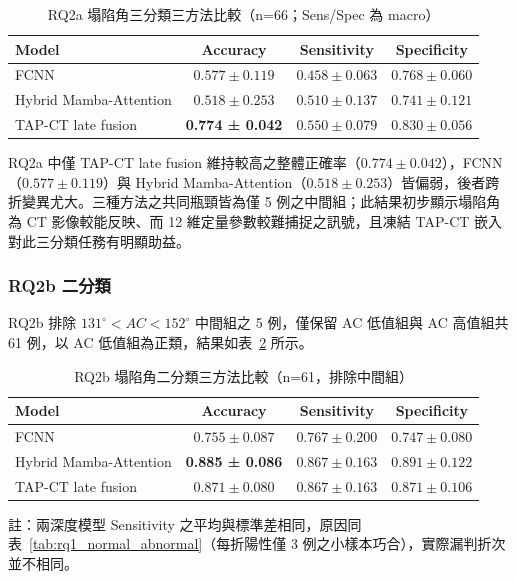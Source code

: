 \begin{ZhChapter}
\begin{table}[htbp]
\centering
\caption{RQ2a 塌陷角三分類三方法比較（n=66；Sens/Spec 為 macro）}
\label{tab:rq2a_3class}
\begingroup
\renewcommand{\arraystretch}{1.25}
\begin{tabularx}{0.95\textwidth}{>{\raggedright\arraybackslash}X c c c}
\hline
Model & Accuracy & Sensitivity & Specificity \\
\hline
FCNN & \(0.577 \pm 0.119\) & \(0.458 \pm 0.063\) & \(0.768 \pm 0.060\) \\
Hybrid Mamba-Attention & \(0.518 \pm 0.253\) & \(0.510 \pm 0.137\) & \(0.741 \pm 0.121\) \\
TAP-CT late fusion & \textbf{0.774 ± 0.042} & \(0.550 \pm 0.079\) & \(0.830 \pm 0.056\) \\
\hline
\end{tabularx}
\endgroup
\end{table}

RQ2a 中僅 TAP-CT late fusion 維持較高之整體正確率（\(0.774 \pm 0.042\)），FCNN（\(0.577 \pm 0.119\)）與 Hybrid Mamba-Attention（\(0.518 \pm 0.253\)）皆偏弱，後者跨折變異尤大。三種方法之共同瓶頸皆為僅 5 例之中間組；此結果初步顯示塌陷角為 CT 影像較能反映、而 12 維定量參數較難捕捉之訊號，且凍結 TAP-CT 嵌入對此三分類任務有明顯助益。

\subsubsection{RQ2b 二分類}

RQ2b 排除 \(131^{\circ} < AC < 152^{\circ}\) 中間組之 5 例，僅保留 AC 低值組與 AC 高值組共 61 例，以 AC 低值組為正類，結果如表~\ref{tab:rq2b_binary} 所示。

\begin{table}[htbp]
\centering
\caption{RQ2b 塌陷角二分類三方法比較（n=61，排除中間組）}
\label{tab:rq2b_binary}
\begingroup
\renewcommand{\arraystretch}{1.25}
\begin{tabularx}{0.95\textwidth}{>{\raggedright\arraybackslash}X c c c}
\hline
Model & Accuracy & Sensitivity & Specificity \\
\hline
FCNN & \(0.755 \pm 0.087\) & \(0.767 \pm 0.200\) & \(0.747 \pm 0.080\) \\
Hybrid Mamba-Attention & \textbf{0.885 ± 0.086} & \(0.867 \pm 0.163\) & \(0.891 \pm 0.122\) \\
TAP-CT late fusion & \(0.871 \pm 0.080\) & \(0.867 \pm 0.163\) & \(0.871 \pm 0.106\) \\
\hline
\end{tabularx}
\par\vspace{0.4em}
{\footnotesize 註：兩深度模型 Sensitivity 之平均與標準差相同，原因同表~\ref{tab:rq1_normal_abnormal}（每折陽性僅 3 例之小樣本巧合），實際漏判折次並不相同。}
\endgroup
\end{table}


\end{ZhChapter}
